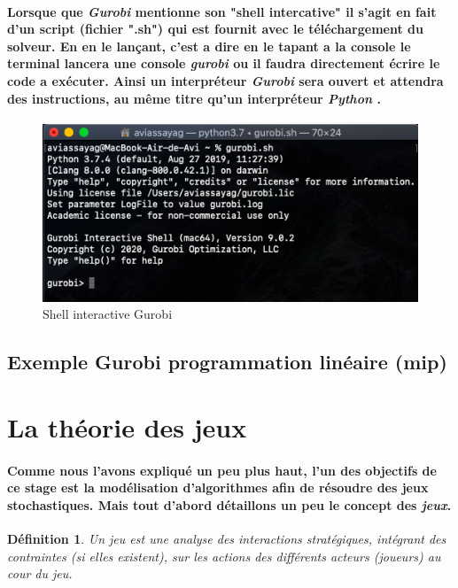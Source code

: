 \documentclass[a4paper, 12pt, twoside]{article}
\newtheorem{definition}{Définition}
\begin{document}
\paragraph{Lorsque que \textit{Gurobi} mentionne son "shell intercative" il s'agit en fait d'un script (fichier ".sh") qui est fournit avec le téléchargement du solveur. En en le lançant, c'est a dire en le tapant a la console le terminal lancera une console \textit{gurobi} ou il faudra directement écrire le code a exécuter. Ainsi un interpréteur \textit{Gurobi} sera ouvert et attendra des instructions, au même titre qu'un interpréteur \textit{Python} .}
\begin{center}
\begin{figure}[h!]
\centering
\includegraphics[scale=0.8]{console.png}
\caption{Shell interactive Gurobi }
\end{figure}
\end{center}

\subsection{Exemple Gurobi programmation linéaire (mip)}

\section{La théorie des jeux}
\paragraph{Comme nous l'avons expliqué un peu plus haut, l'un des objectifs de ce stage est la modélisation d'algorithmes afin de résoudre des jeux stochastiques. Mais tout d'abord détaillons un peu le concept des \textit{jeux}.}
\begin{definition}
Un jeu est une analyse des interactions stratégiques, intégrant des contraintes (si elles existent), sur les actions des différents acteurs (joueurs) au cour du jeu.
\end{definition}
\end{document}
